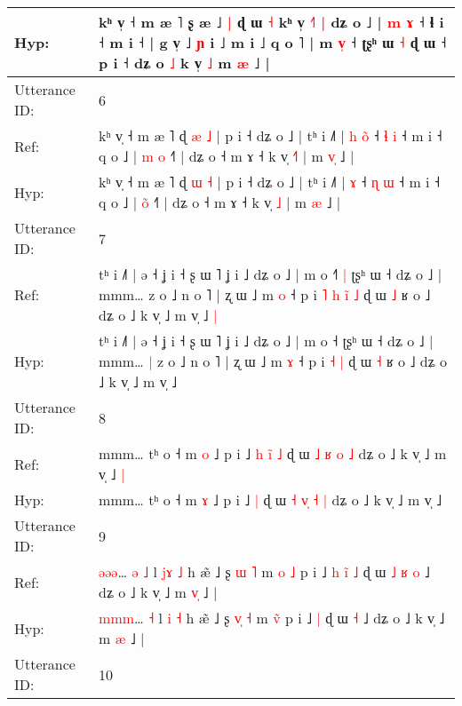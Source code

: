 \documentclass[10pt]{article}
\DeclareRobustCommand{\hl}[1]{{\textcolor{red}{#1}}}
\begin{document}
\begin{longtable}{ll}
 \\
Hyp: & kʰ v̩ ˧ m æ ˥ ʂ æ ˩\hl{ }\hl{|} ɖ ɯ \hl{˧} kʰ v̩\hl{ }\hl{˧}\hl{˥} \hl{|} dʑ o ˩ | \hl{m} \hl{}\hl{ɤ} ˧ ɬ i ˧ m i ˧ | g v̩ ˩ \hl{ɲ} i ˩ m i ˩ q o ˥ | m \hl{v}\hl{̩} ˧ ʈʂʰ ɯ\hl{}\hl{} \hl{˧} ɖ ɯ ˧ p i ˧\hl{}\hl{}\hl{} dʑ o \hl{˩} k v̩\hl{}\hl{}\hl{} \hl{˩} m \hl{}\hl{æ} ˩ |
 \\
\midrule
Utterance ID: & 6 \\
Ref: & kʰ v̩ ˧ m æ ˥ ɖ \hl{æ} \hl{˩} | p i ˧ dʑ o ˩ | tʰ i ˩˥ |\hl{ }\hl{h} \hl{o}\hl{̃} ˧ \hl{ɬ} \hl{i} ˧ m i ˧ q o ˩ | \hl{m}\hl{ }\hl{o} ˧˥ | dʑ o ˧ m ɤ ˧ k v̩ \hl{˧}\hl{˥} | m \hl{v}\hl{̩} ˩ |
 \\
Hyp: & kʰ v̩ ˧ m æ ˥ ɖ \hl{ɯ} \hl{˧} | p i ˧ dʑ o ˩ | tʰ i ˩˥ |\hl{}\hl{} \hl{}\hl{ɤ} ˧ \hl{ɳ} \hl{ɯ} ˧ m i ˧ q o ˩ | \hl{}\hl{o}\hl{̃} ˧˥ | dʑ o ˧ m ɤ ˧ k v̩ \hl{}\hl{˩} | m \hl{}\hl{æ} ˩ |
 \\
\midrule
Utterance ID: & 7 \\
Ref: & tʰ i ˩˥ | ə ˧ ʝ i ˧ ʂ ɯ ˥ ʝ i ˩ dʑ o ˩ | m o ˧\hl{˥}\hl{ }\hl{|} ʈʂʰ ɯ ˧ dʑ o ˩ | mmm…\hl{}\hl{} z o ˩ n o ˥ | ʐ ɯ ˩ m \hl{o} ˧ p i\hl{ }\hl{˥}\hl{ }\hl{h} \hl{i}\hl{̃} \hl{˩} ɖ ɯ \hl{˩} ʁ o ˩ dʑ o ˩ k v̩ ˩ m v̩ ˩\hl{ }\hl{|}
 \\
Hyp: & tʰ i ˩˥ | ə ˧ ʝ i ˧ ʂ ɯ ˥ ʝ i ˩ dʑ o ˩ | m o ˧\hl{}\hl{}\hl{} ʈʂʰ ɯ ˧ dʑ o ˩ | mmm…\hl{ }\hl{|} z o ˩ n o ˥ | ʐ ɯ ˩ m \hl{ɤ} ˧ p i\hl{}\hl{}\hl{}\hl{} \hl{}\hl{˧} \hl{|} ɖ ɯ \hl{˧} ʁ o ˩ dʑ o ˩ k v̩ ˩ m v̩ ˩\hl{}\hl{}
 \\
\midrule
Utterance ID: & 8 \\
Ref: & mmm… tʰ o ˧ m \hl{o} ˩ p i ˩\hl{ }\hl{h}\hl{ }\hl{i}\hl{̃} \hl{˩} ɖ ɯ \hl{˩} \hl{}\hl{ʁ} \hl{o} \hl{˩} dʑ o ˩ k v̩ ˩ m v̩ ˩\hl{ }\hl{|}
 \\
Hyp: & mmm… tʰ o ˧ m \hl{ɤ} ˩ p i ˩\hl{}\hl{}\hl{}\hl{}\hl{} \hl{|} ɖ ɯ \hl{˧} \hl{v}\hl{̩} \hl{˧} \hl{|} dʑ o ˩ k v̩ ˩ m v̩ ˩\hl{}\hl{}
 \\
\midrule
Utterance ID: & 9 \\
Ref: & \hl{ə}\hl{ə}\hl{ə}…\hl{ }\hl{ə} \hl{˩} l \hl{j}\hl{ɤ} \hl{˩} h æ̃ ˩ ʂ \hl{}\hl{ɯ} \hl{˥} m \hl{o}\hl{ }\hl{˩} p i ˩\hl{ }\hl{h}\hl{ }\hl{i}\hl{̃} \hl{˩} ɖ ɯ\hl{ }\hl{˩}\hl{ }\hl{ʁ} \hl{o} ˩ dʑ o ˩ k v̩ ˩ m \hl{v}\hl{̩} ˩ |
 \\
Hyp: & \hl{m}\hl{m}\hl{m}…\hl{}\hl{} \hl{˧} l \hl{}\hl{i} \hl{˧} h æ̃ ˩ ʂ \hl{v}\hl{̩} \hl{˧} m \hl{}\hl{v}\hl{̃} p i ˩\hl{}\hl{}\hl{}\hl{}\hl{} \hl{|} ɖ ɯ\hl{}\hl{}\hl{}\hl{} \hl{˧} ˩ dʑ o ˩ k v̩ ˩ m \hl{}\hl{æ} ˩ |
 \\
\midrule
Utterance ID: & 10 \\

\end{longtable}
\end{document}
